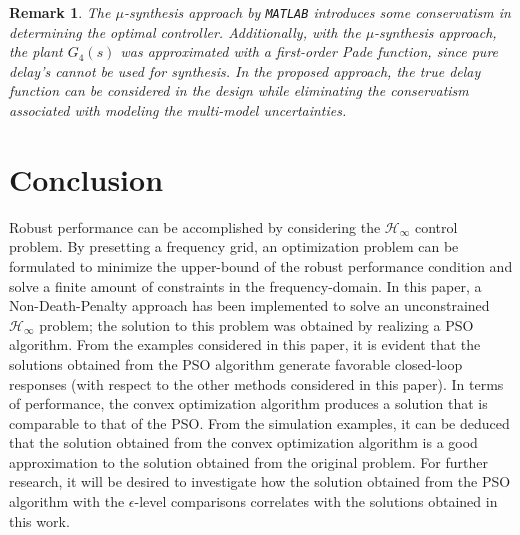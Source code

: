 \documentclass[letterpaper, 10 pt, conference]{ieeeconf}  %
\newtheorem*{remark*}{Remark}
\begin{document}
\begin{remark*}
The $\mu$-synthesis approach by \texttt{MATLAB} introduces some conservatism in determining the optimal controller. Additionally, with the $\mu$-synthesis approach, the plant $G_4(s)$ was approximated with a first-order Pade function, since pure delay's cannot be used for synthesis. In the proposed approach, the true delay function can be considered in the design while eliminating the conservatism associated with modeling the multi-model uncertainties. 
\end{remark*}


\section{Conclusion} \label{sec:conclusion}
Robust performance can be accomplished by considering the $\mathcal{H}_{\infty}$ control problem. By presetting a frequency grid, an optimization problem can be formulated to minimize the upper-bound of the robust performance condition and solve a finite amount of constraints in the frequency-domain. In this paper, a Non-Death-Penalty approach has been implemented to solve an unconstrained $\mathcal{H}_{\infty}$ problem; the solution to this problem was obtained by realizing a PSO algorithm. From the examples considered in this paper, it is evident that the solutions obtained from the PSO algorithm generate favorable closed-loop responses (with respect to the other methods considered in this paper). In terms of performance, the convex optimization algorithm produces a solution that is comparable to that of the PSO. From the simulation examples, it can be deduced that the solution obtained from the convex optimization algorithm is a good approximation to the solution obtained from the original problem. For further research, it will be desired to investigate how the solution obtained from the PSO algorithm with the $\epsilon$-level comparisons correlates with the solutions obtained in this work.


\end{document}
